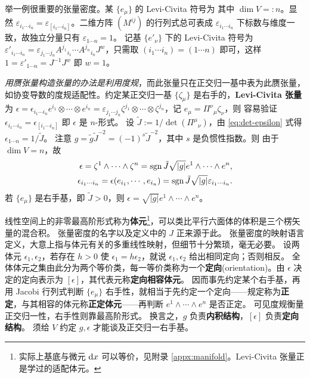 举一例很重要的张量密度。某 $\{e_\mu\}$ 的 Levi-Civita 符号为
其中 $\dim V=:n$。显然 $\varepsilon_{i_1\cdots i_n}=\varepsilon_{[i_1\cdots i_n]}$。二维方阵 $(M^{ij})$ 的行列式总可表成
$\varepsilon_{i_1\cdots i_n}$ 下标数与维度一致，故独立分量只有 $\varepsilon_{1\cdots n}=1$。
记基 $\{e'_\nu\}$ 下的 Levi-Civita 符号为 $\varepsilon'_{i_1\cdots i_n}=\varepsilon_{j_1\cdots j_n} A^{j_1}{}_{i_1} \cdots A^{j_n}{}_{i_n} J^w$，只需取 $(i_1\cdots i_n)=(1\cdots n)$ 即可，这样 $1=\varepsilon'_{1\cdots n}=J^{-1} J^w$ 即 $w=1$。

\emph{用赝张量构造张量的办法是利用度规}，而此张量只在正交归一基中表为此赝张量，如协变导数的度规适配性。约定某正交归一基 $\{\zeta_\mu\}$ 是右手的，\textbf{Levi-Civita 张量}为 $\epsilon=\epsilon_{i_1\cdots i_n} e^{i_1}\otimes\cdots\otimes e^{i_n}=\varepsilon_{j_1\cdots j_n} \zeta^{j_1}\otimes\cdots\otimes \zeta^{j_n}$，记 $e_\mu=\Pi^\nu{ }_\mu \zeta_\nu$，则
容易验证 $\epsilon_{i_1\cdots i_n}=\epsilon_{[i_1\cdots i_n]}$ 即 $\epsilon$ 是 $n$-形式。
设 $\tilde J:=1/\det(\Pi^\mu{}_\nu)$，由 \eqref{eq:det-epsilon} 式得 $\epsilon_{1\cdots n}=1/\tilde J$。
注意 $g=\tilde g\tilde J^{-2}=(-1)^s\tilde J^{-2}$，其中 $s$ 是负惯性指数。则
由于 $\dim V=n$，故
\begin{align}
    \epsilon=\zeta^{1}\wedge\cdots\wedge \zeta^{n}=\operatorname{sgn}\tilde J\sqrt{|g|}e^{1}\wedge\cdots\wedge e^{n},\\
    \epsilon_{i_1\cdots i_n}=\epsilon(e_{i_1},\cdots,e_{i_n})=\operatorname{sgn}\tilde J\sqrt{|g|}\varepsilon_{i_1\cdots i_n}.
\end{align}
若 $\{e_\mu\}$ 是右手基，即 $\tilde J>0$，则 $\epsilon=\sqrt{|g|}e^{1}\wedge\cdots\wedge e^{n}$。

线性空间上的非零最高阶形式称为\textbf{体元}\footnote{实际上基底与微元 $\dd x$ 可以等价，见附录 \ref{appx:manifold}。Levi-Civita 张量正是学过的适配体元。}，可以类比平行六面体的体积是三个楞矢量的混合积。
张量密度的名字以及定义中的 $J$ 正来源于此。
张量密度的映射语言定义，大意上指与体元有关的多重线性映射，但细节十分繁琐，毫无必要。
设两体元 $\epsilon_1,\epsilon_2$，若存在 $h>0$ 使 $\epsilon_1=h\epsilon_2$，就说 $\epsilon_1,\epsilon_2$ 给出相同定向；否则相反。
全体体元之集由此分为两个等价类，每一等价类称为一个\textbf{定向}(orientation)。由 $\epsilon$ 决定的定向表示为 $[\epsilon]$，其代表元称\textbf{定向相容体元}。
因而事先约定某个右手基，再用 Jacobi 行列式判断 $\{e_\mu\}$ 右手性，就相当于先约定一个定向——规定称为\textbf{正定}，与其相容的体元称\textbf{正定体元}——再判断 $e^{1}\wedge\cdots\wedge e^{n}$ 是否正定。
可见度规衡量正交归一性，右手性则靠最高阶形式。
换言之，$g$ 负责\textbf{内积结构}，$[\epsilon]$ 负责\textbf{定向结构}。
须给 $V$ 约定 $g,\epsilon$ 才能谈及正交归一右手基。

